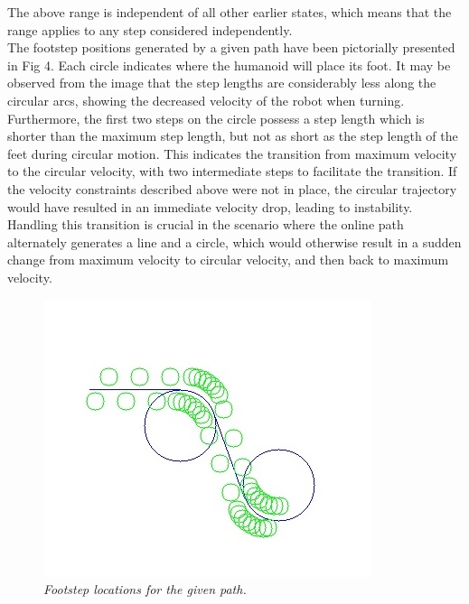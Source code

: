 \documentclass[letterpaper, 10 pt, conference]{ieeeconf}  %
\begin{document}
The above range is independent of all other earlier states, which means that the range applies to any step considered independently.\\
The footstep positions generated by a given path have been pictorially presented in Fig 4. Each circle indicates where the humanoid will place its foot. It may be observed from the image that the step lengths are considerably less along the circular arcs, showing the decreased velocity of the robot when turning. Furthermore, the first two steps on the circle possess a step length which is shorter than the maximum step length, but not as short as the step length of the feet during circular motion. This indicates the transition from maximum velocity to the circular velocity, with two intermediate steps to facilitate the transition. If the velocity constraints described above were not in place, the circular trajectory would have resulted in an immediate velocity drop, leading to instability. Handling this transition is crucial in the scenario where the online path alternately generates a line and a circle, which would otherwise result in a sudden change from maximum velocity to circular velocity, and then back to maximum velocity.
\begin{figure}[h]  
\begin{center}  
\includegraphics[scale=01.0]{footstep.jpg}  
\caption{\small \sl Footstep locations for the given path.\label{fig:footstep}}  
\end{center}  
\end{figure}
\end{document}
